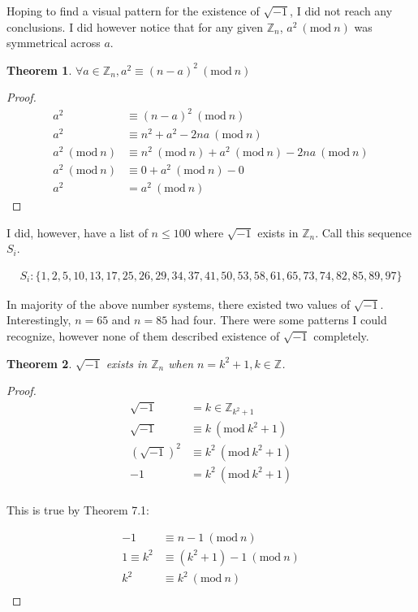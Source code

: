 \documentclass[12pt]{article}
\newcommand{\bZ}{{\mathbb{Z}}}
\newcommand{\Mod}[1]{\ (\mathrm{mod}\ #1)}
\newtheorem{theorem}{Theorem}[section]
\begin{document}
		Hoping to find a visual pattern for the existence of $\sqrt{-1}$, I did not reach any conclusions. I did however notice that for any given $\bZ_n$, $a^2 \Mod{n}$ was symmetrical across $a$.

\pagebreak

		\begin{theorem}
			$\forall a \in \bZ_n, a^2 \equiv (n-a)^2 \Mod{n}$
		\end{theorem}

		\begin{proof}
			\begin{align*}
				a^2 &\equiv (n-a)^2 \Mod{n}\\
				a^2 &\equiv n^2 + a^2 - 2na \Mod{n}\\
				a^2 \Mod{n} &\equiv n^2 \Mod{n} + a^2 \Mod{n} - 2na \Mod{n}\\
				a^2 \Mod{n} &\equiv 0 + a^2 \Mod{n} - 0\\
				a^2 &= a^2 \Mod{n}
			\end{align*}
		\end{proof}

		I did, however, have a list of $n \le 100$ where $\sqrt{-1}$ exists in $\bZ_n$. Call this sequence $S_i$.

		\begin{align*}
			S_i : \{1, 2, 5, 10, 13, 17, 25, 26, 29, 34, 37, 41, 50, 53, 58, 61, 65, 73, 74, 82, 85, 89, 97\}
		\end{align*}

		In majority of the above number systems, there existed two values of $\sqrt{-1}$. Interestingly, $n=65$ and $n=85$ had four. There were some patterns I could recognize, however none of them described existence of $\sqrt{-1}$ completely.

		\begin{theorem}
			$\sqrt{-1}$ exists in $\bZ_n$ when $n = k^2 +1, k \in \bZ$.
		\end{theorem}

		\begin{proof}
			\begin{align*}
				\sqrt{-1} &= k \in \bZ_{k^2+1}\\
				\sqrt{-1} &\equiv k \Mod{k^2+1}\\
				(\sqrt{-1})^2 &\equiv k^2 \Mod{k^2+1}\\
				-1 &= k^2 \Mod{k^2+1}\\
			\end{align*}

			This is true by Theorem 7.1:

			\begin{align*}
				-1 &\equiv n-1 \Mod{n}\\
				1 \equiv k^2 &\equiv (k^2 + 1)-1 \Mod{n}\\
				k^2 &\equiv k^2 \Mod{n}\\
			\end{align*}
		\end{proof}
\end{document}
